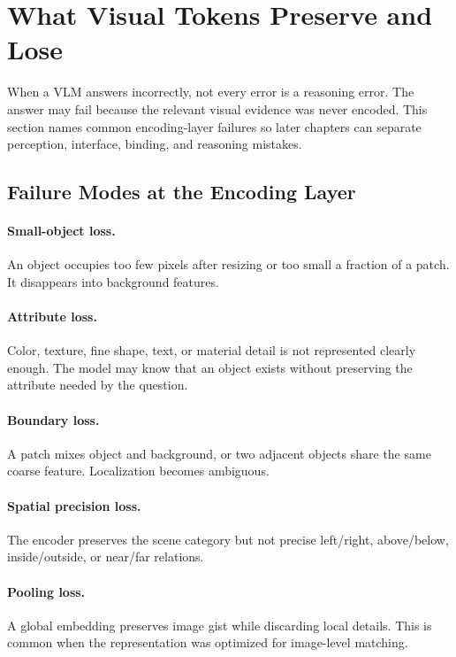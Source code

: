 \section{What Visual Tokens Preserve and Lose}
\label{sec:ch23-preserve-lose}

When a VLM answers incorrectly, not every error is a reasoning error. The answer may fail because the relevant visual evidence was never encoded. This section names common encoding-layer failures so later chapters can separate perception, interface, binding, and reasoning mistakes.

\subsection{Failure Modes at the Encoding Layer}

\paragraph{Small-object loss.} An object occupies too few pixels after resizing or too small a fraction of a patch. It disappears into background features.

\paragraph{Attribute loss.} Color, texture, fine shape, text, or material detail is not represented clearly enough. The model may know that an object exists without preserving the attribute needed by the question.

\paragraph{Boundary loss.} A patch mixes object and background, or two adjacent objects share the same coarse feature. Localization becomes ambiguous.

\paragraph{Spatial precision loss.} The encoder preserves the scene category but not precise left/right, above/below, inside/outside, or near/far relations.

\paragraph{Pooling loss.} A global embedding preserves image gist while discarding local details. This is common when the representation was optimized for image-level matching.

